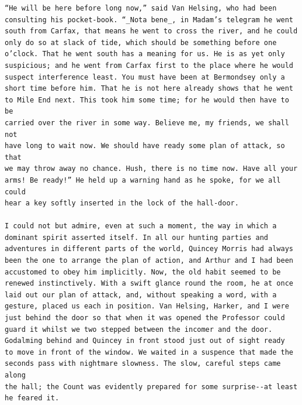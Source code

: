 \documentclass{article}
\begin{document}
\begin{verbatim}
“He will be here before long now,” said Van Helsing, who had been
consulting his pocket-book. “_Nota bene_, in Madam’s telegram he went
south from Carfax, that means he went to cross the river, and he could
only do so at slack of tide, which should be something before one
o’clock. That he went south has a meaning for us. He is as yet only
suspicious; and he went from Carfax first to the place where he would
suspect interference least. You must have been at Bermondsey only a
short time before him. That he is not here already shows that he went
to Mile End next. This took him some time; for he would then have to be
carried over the river in some way. Believe me, my friends, we shall not
have long to wait now. We should have ready some plan of attack, so that
we may throw away no chance. Hush, there is no time now. Have all your
arms! Be ready!” He held up a warning hand as he spoke, for we all could
hear a key softly inserted in the lock of the hall-door.

I could not but admire, even at such a moment, the way in which a
dominant spirit asserted itself. In all our hunting parties and
adventures in different parts of the world, Quincey Morris had always
been the one to arrange the plan of action, and Arthur and I had been
accustomed to obey him implicitly. Now, the old habit seemed to be
renewed instinctively. With a swift glance round the room, he at once
laid out our plan of attack, and, without speaking a word, with a
gesture, placed us each in position. Van Helsing, Harker, and I were
just behind the door so that when it was opened the Professor could
guard it whilst we two stepped between the incomer and the door.
Godalming behind and Quincey in front stood just out of sight ready
to move in front of the window. We waited in a suspence that made the
seconds pass with nightmare slowness. The slow, careful steps came along
the hall; the Count was evidently prepared for some surprise--at least
he feared it.


\end{verbatim}
\end{document}
